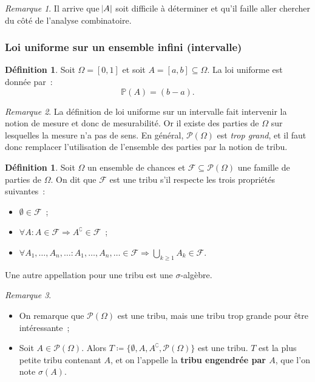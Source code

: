 \documentclass{article}
\renewcommand{\P}{\mathbb P}
\theoremstyle{definition}
\newtheorem{déf}[thm]{Définition}
\theoremstyle{remark}
\newtheorem*{rmq}{Remarque}
\begin{document}
		\begin{rmq} Il arrive que $\abs A$ soit difficile à déterminer et qu'il faille aller chercher du côté de l'analyse combinatoire. \end{rmq}

		\subsubsection{Loi uniforme sur un ensemble infini (intervalle)}

		\begin{déf} Soit $\Omega = [0, 1]$ et soit $A = [a, b] \subseteq \Omega$. La loi uniforme est donnée par~:
		\[\P(A) = (b-a).\] \end{déf}

		\begin{rmq} La définition de loi uniforme sur un intervalle fait intervenir la notion de mesure et donc de mesurabilité. Or il existe des parties de
		$\Omega$ sur lesquelles la mesure n'a pas de sens. En général, $\mathcal P(\Omega)$ est \textit{trop grand}, et il faut donc remplacer l'utilisation
		de l'ensemble des parties par la notion de tribu. \end{rmq}

		\begin{déf} Soit $\Omega$ un ensemble de chances et $\mathcal F \subseteq \mathcal P(\Omega)$ une famille de parties de $\Omega$. On dit que
		$\mathcal F$ est une tribu s'il respecte les trois propriétés suivantes~:
		\begin{itemize}
			\item $\emptyset \in \mathcal F$~;
			\item $\forall A : A \in \mathcal F \Rightarrow A^\complement \in \mathcal F$~;
			\item $\forall A_1, \dotsc, A_n, \ldots : A_1, \dotsc, A_n, \ldots \in \mathcal F \Rightarrow \bigcup_{k \geq 1}A_k \in \mathcal F$.
		\end{itemize}

		Une autre appellation pour une tribu est une $\sigma$-algèbre.
		\end{déf}

		\begin{rmq}~
		\begin{itemize}
			\item On remarque que $\mathcal P(\Omega)$ est une tribu, mais une tribu trop grande pour être intéressante~;
			\item Soit $A \in \mathcal P(\Omega)$. Alors $T \coloneqq \{\emptyset, A, A^\complement, \mathcal P(\Omega)\}$ est une tribu.
			      $T$ est la plus petite tribu contenant $A$, et on l'appelle la \textbf{tribu engendrée par $A$}, que l'on note $\sigma(A)$.
		\end{itemize}
		\end{rmq}
\end{document}
